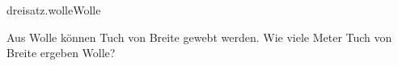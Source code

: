 \begin{exercise}{dreisatz.wolle}{Wolle}
  \ifproblem\problem\par
    Aus  Wolle können  Tuch von  Breite gewebt
    werden. Wie viele Meter Tuch von  Breite ergeben  Wolle?
  \fi
\end{exercise}
